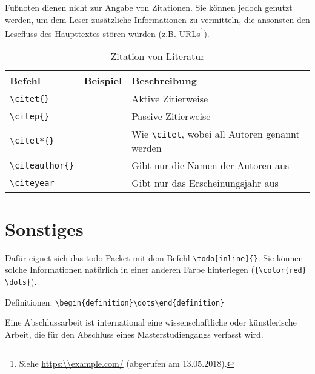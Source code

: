 \documentclass[twoside,bibliography=totoc,openany]{fumi}
\begin{document}
Fußnoten dienen nicht zur Angabe von Zitationen. Sie können jedoch genutzt werden, um dem Leser zusätzliche Informationen zu vermitteln, die ansonsten den Lesefluss des Haupttextes stören würden (z.B. URLs\footnote{Siehe \url{https:\\example.com/} (abgerufen am 13.05.2018).}).

\begin{table}\footnotesize
\caption{\label{zitiercmd}Zitation von Literatur}
\begin{tabularx}{\textwidth}{lXX}
\hline
Befehl & Beispiel & Beschreibung\\\hline
\verb|\citet{}| & \citet{Guerra-Hollstein2017} & Aktive Zitierweise\\
\verb|\citep{}| & \citep{Guerra-Hollstein2017} & Passive Zitierweise\\
\verb|\citet*{}| & \citet*{Guerra-Hollstein2017} & Wie \verb|\citet|, wobei all Autoren genannt werden\\
\verb|\citeauthor{}| & \citeauthor{Guerra-Hollstein2017} & Gibt nur die Namen der Autoren aus\\
\verb|\citeyear| & \citeyear{Guerra-Hollstein2017} & Gibt nur das Erscheinungsjahr aus\\
\hline
\end{tabularx}
\end{table}

\section{Sonstiges}

 Dafür eignet sich das todo-Packet mit dem Befehl \protect\verb|\todo[inline]{}|. {\color{red} Sie können solche Informationen natürlich in einer anderen Farbe hinterlegen (\verb|{\color{red} \dots}|).}

Definitionen: \verb|\begin{definition}\dots\end{definition}|

\begin{definition}
Eine Abschlussarbeit ist international eine wissenschaftliche oder künstlerische Arbeit, die für den Abschluss eines Masterstudiengangs verfasst wird.
\end{definition}
\end{document}
